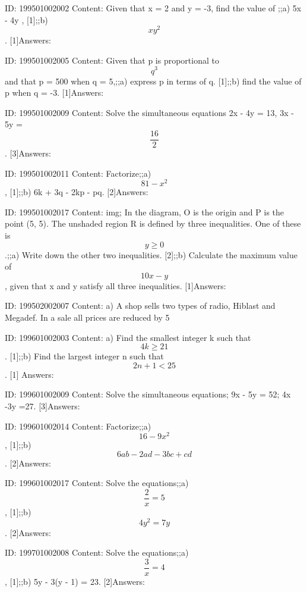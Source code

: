 \documentclass{article}
\begin{document}
ID: 199501002002
Content:
Given that x = 2 and y = -3, find the value of ;;a) 5x - 4y , [1];;b) $$xy^2$$. [1]Answers:

ID: 199501002005
Content:
Given that p is proportional to $$q^3$$ and that p = 500 when q = 5,;;a) express p in terms of q. [1];;b) find the value of p when q = -3. [1]Answers:

ID: 199501002009
Content:
Solve the simultaneous equations 2x - 4y = 13, 3x - 5y = $$\frac{16}{2}$$. [3]Answers:

ID: 199501002011
Content:
Factorize;;a) $$81 - x^2$$ , [1];;b) 6k + 3q - 2kp - pq. [2]Answers:

ID: 199501002017
Content:
img; In the diagram, O is the origin and P is the point (5, 5). The unshaded region R is defined by three inequalities. One of these is $$y  \geq  0$$.;;a) Write down the other two inequalities. [2];;b) Calculate the maximum value of $$10x - y$$, given that x and y satisfy all three inequalities. [1]Answers:

ID: 199502002007
Content:
a) A shop sells two types of radio, Hiblast and Megadef. In a sale all prices are reduced by 5%

ID: 199601002003
Content:
a) Find the smallest integer k such that $$4k\geq21$$. [1];;b) Find the largest integer n such that $$2n + 1 < 25$$. [1] Answers:

ID: 199601002009
Content:
Solve the simultaneous equations; 9x - 5y = 52; 4x -3y =27. [3]Answers:

ID: 199601002014
Content:
Factorize;;a) $$16 - 9x^2$$, [1];;b) $$6ab - 2ad - 3bc + cd$$. [2]Answers:

ID: 199601002017
Content:
Solve the equations;;a) $$\frac{2}{x} = 5$$, [1];;b) $$4y^2 = 7y$$. [2]Answers:

ID: 199701002008
Content:
Solve the equations;;a) $$\frac{3}{x}=4$$, [1];;b) 5y - 3(y - 1) = 23. [2]Answers:
\end{document}
